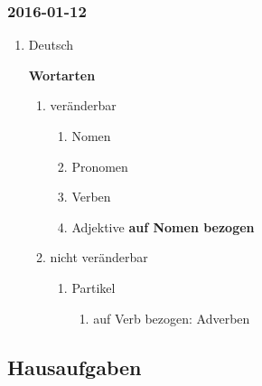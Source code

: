 \documentclass[11pt]{article}
\begin{document}
\subsubsection{2016-01-12}
\label{sec-1-2-12}
\begin{enumerate}
\item Deutsch
\label{sec-1-2-12-1}

\textbf{Wortarten}

\begin{enumerate}
\item veränderbar
\label{sec-1-2-12-1-1}
\begin{enumerate}
\item Nomen
\label{sec-1-2-12-1-1-1}
\item Pronomen
\label{sec-1-2-12-1-1-2}
\item Verben
\label{sec-1-2-12-1-1-3}
\item Adjektive
\label{sec-1-2-12-1-1-4}
\textbf{auf Nomen bezogen}
\end{enumerate}
\item nicht veränderbar
\label{sec-1-2-12-1-2}
\begin{enumerate}
\item Partikel
\label{sec-1-2-12-1-2-1}
\begin{enumerate}
\item auf Verb bezogen: Adverben
\label{sec-1-2-12-1-2-1-1}
\end{enumerate}
\end{enumerate}
\end{enumerate}
\end{enumerate}

\subsection{Hausaufgaben}
\label{sec-1-3}
\end{document}
